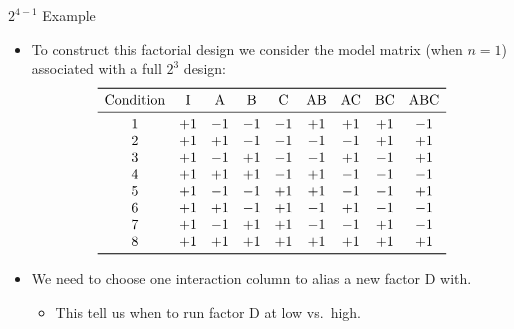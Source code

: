 \begin{Example}{$ 2^{4-1} $ Example}{}
      \begin{itemize}
            \item To construct this factorial design we consider the model matrix (when $n = 1$) associated with a
                  full $2^3$ design:
                  \[ \begin{array}{ccccccccc}
                              \toprule
                              \text{Condition} & \text{I} & \text{A} & \text{B} & \text{C} & \text{AB} & \text{AC} & \text{BC} & \text{ABC} \\
                              \midrule
                              1                & +1       & -1       & -1       & -1       & +1        & +1        & +1        & -1         \\
                              2                & +1       & +1       & -1       & -1       & -1        & -1        & +1        & +1         \\
                              3                & +1       & -1       & +1       & -1       & -1        & +1        & -1        & +1         \\
                              4                & +1       & +1       & +1       & -1       & +1        & -1        & -1        & -1         \\
                              5                & +1       & -1       & -1       & +1       & +1        & -1        & -1        & +1         \\
                              6                & +1       & +1       & -1       & +1       & -1        & +1        & -1        & -1         \\
                              7                & +1       & -1       & +1       & +1       & -1        & -1        & +1        & -1         \\
                              8                & +1       & +1       & +1       & +1       & +1        & +1        & +1        & +1         \\
                              \bottomrule
                        \end{array} \]
            \item We need to choose one interaction column to alias a new factor D with.
                  \begin{itemize}[$\hookrightarrow$]
                        \item This tell us when to run factor D at low vs.\ high.

\end{itemize}
\end{itemize}
\end{Example}
